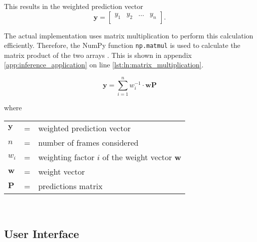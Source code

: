 This results in the weighted prediction vector
\begin{equation}
  \boldsymbol{y} =
  \begin{bmatrix}
    y_{1} & y_{2} & \dots & y_{n} \\
  \end{bmatrix}.
  \label{eq:weighted_prediction_vector}
\end{equation}

The actual implementation uses matrix multiplication to perform this calculation efficiently.
Therefore, the NumPy function \texttt{np.matmul} is used to calculate the matrix product of the two arrays \cite{}. %
This is shown in appendix \ref{app:inference_application} on line \ref{lst:ln:matrix_multiplication}.

\begin{equation}
  \boldsymbol{y} = \sum\limits_{i=1}^{n} w_i^{-1} \cdot \boldsymbol{w} \boldsymbol{P}
  \label{eq:weighted_prediction}
\end{equation}

where

\begin{tabular}{lll}
  $\boldsymbol{y}$ & = & weighted prediction vector \\ %
  $n$ & = & number of frames considered \\
  $w_i$ & = & weighting factor $i$ of the weight vector $\boldsymbol{w}$ \\
  $\boldsymbol{w}$ & = & weight vector \\ %
  $\boldsymbol{P}$ & = & predictions matrix \\ %
\end{tabular}
\\

\subsection{User Interface}
\label{subsec:inference:app:ui}

